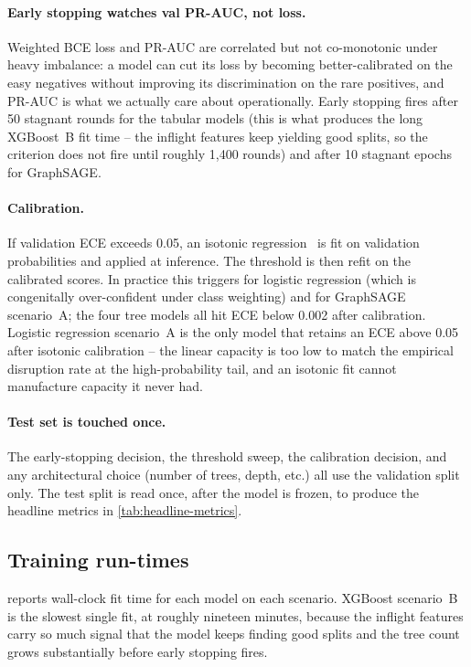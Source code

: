 \paragraph{Early stopping watches val PR-AUC, not loss.} Weighted BCE loss and PR-AUC are correlated but not co-monotonic under heavy imbalance: a model can cut its loss by becoming better-calibrated on the easy negatives without improving its discrimination on the rare positives, and PR-AUC is what we actually care about operationally. Early stopping fires after 50 stagnant rounds for the tabular models (this is what produces the long XGBoost~B fit time -- the inflight features keep yielding good splits, so the criterion does not fire until roughly 1{,}400 rounds) and after 10 stagnant epochs for GraphSAGE.

\paragraph{Calibration.} If validation ECE exceeds \num{0.05}, an isotonic regression~\cite{zadrozny2001calibration} is fit on validation probabilities and applied at inference. The threshold is then refit on the calibrated scores. In practice this triggers for logistic regression (which is congenitally over-confident under class weighting) and for GraphSAGE scenario~A; the four tree models all hit ECE below \num{0.002} after calibration. Logistic regression scenario~A is the only model that retains an ECE above \num{0.05} after isotonic calibration -- the linear capacity is too low to match the empirical disruption rate at the high-probability tail, and an isotonic fit cannot manufacture capacity it never had.

\paragraph{Test set is touched once.} The early-stopping decision, the threshold sweep, the calibration decision, and any architectural choice (number of trees, depth, etc.) all use the validation split only. The test split is read once, after the model is frozen, to produce the headline metrics in \cref{tab:headline-metrics}.

\subsection{Training run-times}

 reports wall-clock fit time for each model on each scenario. XGBoost scenario~B is the slowest single fit, at roughly nineteen minutes, because the inflight features carry so much signal that the model keeps finding good splits and the tree count grows substantially before early stopping fires.

